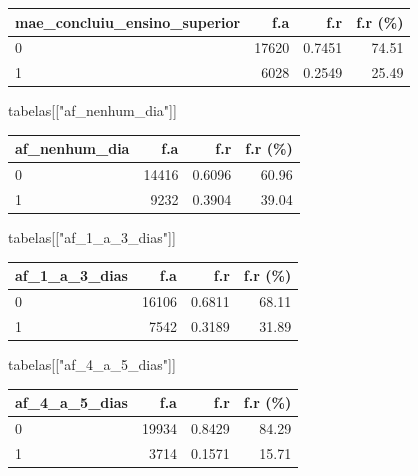 \documentclass[
]{article}
\newenvironment{Shaded}{\begin{snugshade}}{\end{snugshade}}
\newcommand{\NormalTok}[1]{\textcolor[rgb]{0.00,0.23,0.31}{#1}}
\newcommand{\StringTok}[1]{\textcolor[rgb]{0.13,0.47,0.30}{#1}}
\begin{document}
\begin{longtable}[]{@{}lrrr@{}}
\toprule()
mae\_concluiu\_ensino\_superior & f.a & f.r & f.r (\%) \\
\midrule()
\endhead
0 & 17620 & 0.7451 & 74.51 \\
1 & 6028 & 0.2549 & 25.49 \\
\bottomrule()
\end{longtable}

\begin{Shaded}
\begin{Highlighting}[]
\NormalTok{tabelas[[}\StringTok{"af\_nenhum\_dia"}\NormalTok{]]}
\end{Highlighting}
\end{Shaded}

\begin{longtable}[]{@{}lrrr@{}}
\toprule()
af\_nenhum\_dia & f.a & f.r & f.r (\%) \\
\midrule()
\endhead
0 & 14416 & 0.6096 & 60.96 \\
1 & 9232 & 0.3904 & 39.04 \\
\bottomrule()
\end{longtable}

\begin{Shaded}
\begin{Highlighting}[]
\NormalTok{tabelas[[}\StringTok{"af\_1\_a\_3\_dias"}\NormalTok{]]}
\end{Highlighting}
\end{Shaded}

\begin{longtable}[]{@{}lrrr@{}}
\toprule()
af\_1\_a\_3\_dias & f.a & f.r & f.r (\%) \\
\midrule()
\endhead
0 & 16106 & 0.6811 & 68.11 \\
1 & 7542 & 0.3189 & 31.89 \\
\bottomrule()
\end{longtable}

\begin{Shaded}
\begin{Highlighting}[]
\NormalTok{tabelas[[}\StringTok{"af\_4\_a\_5\_dias"}\NormalTok{]]}
\end{Highlighting}
\end{Shaded}

\begin{longtable}[]{@{}lrrr@{}}
\toprule()
af\_4\_a\_5\_dias & f.a & f.r & f.r (\%) \\
\midrule()
\endhead
0 & 19934 & 0.8429 & 84.29 \\
1 & 3714 & 0.1571 & 15.71 \\
\bottomrule()
\end{longtable}
\end{document}
